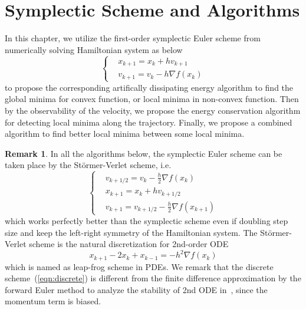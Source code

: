 \documentclass[11pt,fceqn]{article}
\numberwithin{equation}{section}
\theoremstyle{definition}
\newtheorem{rem}[thm]{Remark}
\begin{document}
\section{Symplectic Scheme and Algorithms}
\label{sec:symplectic}
In this chapter, we utilize the first-order symplectic Euler scheme from numerically solving Hamiltonian system as below
\begin{equation}
\label{eqn:symplectic_euler}
\left\{\begin{aligned}
         & x_{k+1} = x_{k} + h v_{k+1} \\
         & v_{k+1} = v_{k} - h \nabla f(x_{k})
        \end{aligned}\right.
\end{equation}
to propose the corresponding artifically dissipating energy algorithm to find the global minima for convex function, or local minima in non-convex function. Then by the observability of the velocity, we propose the energy conservation algorithm for detecting local minima along the trajectory. Finally, we propose a combined algorithm to find better local minima between some local minima.
\begin{rem}
In all the algorithms below, the symplectic Euler scheme can be taken place by the St\"{o}rmer-Verlet scheme, i.e.  
\begin{equation}
\label{eqn:symplectic_vertex}
\left\{\begin{aligned}
        & v_{k+1/2} = v_{k} - \frac{h}{2}\nabla f(x_{k}) \\
        & x_{k+1} = x_{k} + h v_{k + 1/2} \\
        & v_{k+1} = v_{k + 1/2} - \frac{h}{2} \nabla f(x_{k+1})
        \end{aligned}\right. 
\end{equation}
which works perfectly better than the symplectic scheme even if doubling step size and keep the left-right symmetry of the Hamiltonian system. The St\"{o}rmer-Verlet scheme is the natural discretization for 2nd-order ODE
\begin{equation}
\label{eqn:discrete}
x_{k+1} - 2x_{k} + x_{k-1} = -h^{2}\nabla f(x_{k})
\end{equation}
which is named as leap-frog scheme in PDEs. We remark that the discrete scheme~(\ref{eqn:discrete}) is different from the finite difference approximation by the forward Euler method to analyze the stability of 2nd ODE in~\citep{su2014differential}, since the momentum term is biased.  
\end{rem}
\end{document}
